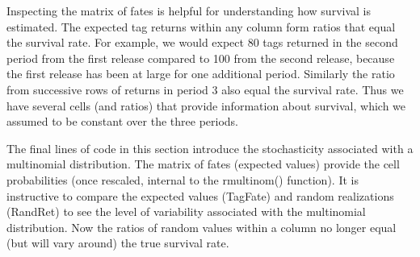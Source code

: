 \documentclass[
]{krantz}
\begin{document}
Inspecting the matrix of fates is helpful for understanding how survival is estimated. The expected tag returns within any column form ratios that equal the survival rate. For example, we would expect 80 tags returned in the second period from the first release compared to 100 from the second release, because the first release has been at large for one additional period. Similarly the ratio from successive rows of returns in period 3 also equal the survival rate. Thus we have several cells (and ratios) that provide information about survival, which we assumed to be constant over the three periods.

The final lines of code in this section introduce the stochasticity associated with a multinomial distribution. The matrix of fates (expected values) provide the cell probabilities (once rescaled, internal to the rmultinom() function). It is instructive to compare the expected values (TagFate) and random realizations (RandRet) to see the level of variability associated with the multinomial distribution. Now the ratios of random values within a column no longer equal (but will vary around) the true survival rate.
\end{document}
